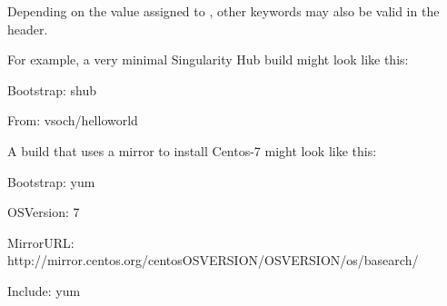 \documentclass[letterpaper,10pt,english]{sphinxmanual}
\begin{document}
\begin{DUlineblock}{0em}
\item[] Depending on the value assigned to , other keywords may also be valid
in the header.
\item[] For example, a very minimal Singularity Hub build might look like
this:
\end{DUlineblock}

%
\begin{sphinxVerbatim}[commandchars=\\\{\}]
Bootstrap: shub

From: vsoch/hello\PYGZhy{}world
\end{sphinxVerbatim}

A build that uses a mirror to install Centos-7 might look like this:

%
\begin{sphinxVerbatim}[commandchars=\\\{\}]
Bootstrap: yum

OSVersion: 7

MirrorURL: http://mirror.centos.org/centos\PYGZhy{}\PYGZpc{}\PYGZob{}OSVERSION\PYGZcb{}/\PYGZpc{}\PYGZob{}OSVERSION\PYGZcb{}/os/\PYGZdl{}basearch/

Include: yum
\end{sphinxVerbatim}
\end{document}
